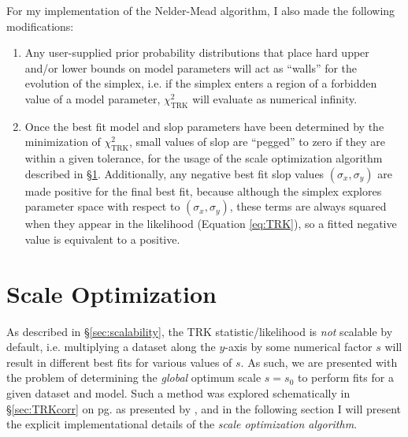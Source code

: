 For my implementation of the Nelder-Mead algorithm, I also made the following modifications:
\begin{enumerate}
    \item \label{enum:newsimplex1}Any user-supplied prior probability distributions that place hard upper and/or lower bounds on model parameters will act as ``walls'' for the evolution of the simplex, i.e. if the simplex enters a region of a forbidden value of a model parameter, $\chi^2_\text{TRK}$ will evaluate as numerical infinity.
    \item \label{enum:newsimplex2}Once the best fit model and slop parameters have been determined by the minimization of $\chi^2_\text{TRK}$, small values of slop are ``pegged'' to zero if they are within a given tolerance, for the usage of the scale optimization algorithm described in \S\ref{sec:scaleop}. Additionally, any negative best fit slop values $(\sigma_x,\sigma_y)$ are made positive for the final best fit, because although the simplex explores parameter space with respect to $(\sigma_x,\sigma_y)$, these terms are always squared when they appear in the likelihood (Equation \eqref{eq:TRK}), so a fitted negative value is equivalent to a positive.
\end{enumerate}

\section{Scale Optimization}
\label{sec:scaleop}

As described in \S\ref{sec:scalability}, the TRK statistic/likelihood is \textit{not} scalable by default, i.e. multiplying a dataset along the $y$-axis by some numerical factor $s$ will result in different best fits for various values of $s$. As such, we are presented with the problem of determining the \textit{global} optimum scale $s=s_0$ to perform fits for a given dataset and model. Such a method was explored schematically in \S\ref{sec:TRKcorr} on pg. \pageref{par:scaleopscheme} as presented by \textcite{trotter}, and in the following section I will present the explicit implementational details of the \textit{scale optimization algorithm}. 

